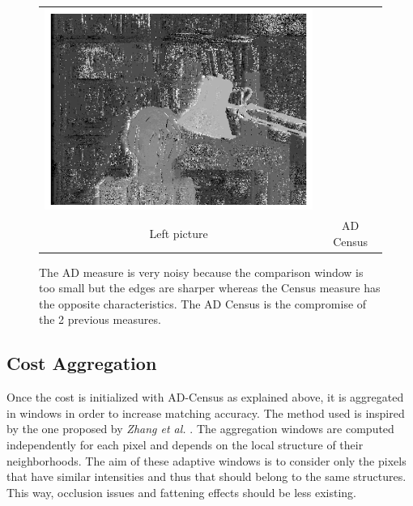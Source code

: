 \documentclass{article}
\begin{document}
\begin{figure}[h]
\begin{center}
\begin{tabular}{cc}
\includegraphics[scale=0.4]{Images/ADCensus_only/disparity_map.png}
\\
Left picture & AD Census 
\end{tabular}
	\caption{The AD measure is very noisy because the comparison window is too small but the edges are sharper whereas the Census measure has the opposite characteristics. The AD Census is the compromise of the 2 previous measures.}
	\label{ADCensusPics}
\end{center}
\end{figure}

\subsection{ Cost Aggregation }

Once the cost is initialized with AD-Census as explained above, it is aggregated in windows in order to increase matching accuracy. The method used is inspired by the one proposed by \textit{ Zhang et al.} \cite{costAggreg}.
The aggregation windows are computed independently for each pixel and depends on the local structure of their neighborhoods. The aim of these adaptive windows is to consider only the pixels that have similar intensities and thus that should belong to the same structures. This way, occlusion issues and fattening effects should be less existing.\\
\end{document}
